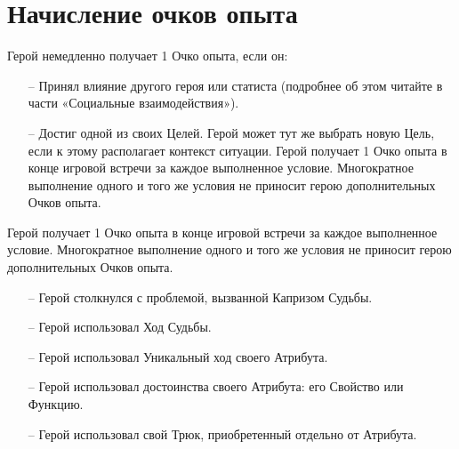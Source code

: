 \section{Начисление очков опыта}
Герой немедленно получает 1 Очко опыта, если он:
\begin{itemize}
\item[--] Принял влияние другого героя или статиста (подробнее об этом читайте в части «Социальные взаимодействия»).
\item[--] Достиг одной из своих Целей. Герой может тут же выбрать новую Цель, если к этому располагает контекст ситуации. Герой получает 1 Очко опыта в конце игровой встречи за каждое выполненное условие. Многократное выполнение одного и того же условия не приносит герою дополнительных Очков опыта.
\end{itemize}
Герой получает 1 Очко опыта в конце игровой встречи за каждое
выполненное условие. Многократное выполнение одного и того же
условия не приносит герою дополнительных Очков опыта.
\begin{itemize}
\item[--] Герой столкнулся с проблемой, вызванной Капризом Судьбы.
\item[--] Герой использовал Ход Судьбы.
\item[--] Герой использовал Уникальный ход своего Атрибута.
\item[--] Герой использовал достоинства своего Атрибута: его Свойство или Функцию.
\item[--] Герой использовал свой Трюк, приобретенный отдельно от Атрибута.
\end{itemize}

